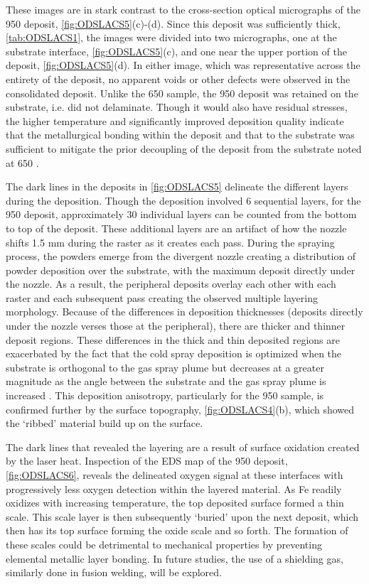 	These images are in stark contrast to the cross-section optical micrographs of the 950 \celsius{} deposit, \ref{fig:ODSLACS5}(c)-(d). Since this deposit was sufficiently thick, \ref{tab:ODSLACS1}, the images were divided into two micrographs, one at the substrate interface, \ref{fig:ODSLACS5}(c), and one near the upper portion of the deposit, \ref{fig:ODSLACS5}(d). In either image, which was representative across the entirety of the deposit, no apparent voids or other defects were observed in the consolidated deposit. Unlike the 650 \celsius{} sample, the 950 \celsius{} deposit was retained on the substrate, i.e. did not delaminate. Though it would also have residual stresses, the higher temperature and significantly improved deposition quality indicate that the metallurgical bonding within the deposit and that to the substrate was sufficient to mitigate the prior decoupling of the deposit from the substrate noted at 650 \celsius{}. 



	The dark lines in the deposits in \ref{fig:ODSLACS5} delineate the different layers during the deposition. Though the deposition involved 6 sequential layers, for the 950 \celsius{} deposit, approximately 30 individual layers can be counted from the bottom to top of the deposit. These additional layers are an artifact of how the nozzle shifts 1.5 mm during the raster as it creates each pass. During the spraying process, the powders emerge from the divergent nozzle creating a distribution of powder deposition over the substrate, with the maximum deposit directly under the nozzle. As a result, the peripheral deposits overlay each other with each raster and each subsequent pass creating the observed multiple layering morphology. Because of the differences in deposition thicknesses (deposits directly under the nozzle verses those at the peripheral), there are thicker and thinner deposit regions. These differences in the thick and thin deposited regions are exacerbated by the fact that the cold spray deposition is optimized when the substrate is orthogonal to the gas spray plume but decreases at a greater magnitude as the angle between the substrate and the gas spray plume is increased \cite{RN500}. This deposition anisotropy, particularly for the 950 \celsius{} sample, is confirmed further by the surface topography, \ref{fig:ODSLACS4}(b), which showed the ‘ribbed’ material build up on the surface. 



	 The dark lines that revealed the layering are a result of surface oxidation created by the laser heat. Inspection of the EDS map of the 950 \celsius{} deposit, \ref{fig:ODSLACS6}, reveals the delineated oxygen signal at these interfaces with progressively less oxygen detection within the layered material. As Fe readily oxidizes with increasing temperature, the top deposited surface formed a thin scale. This scale layer is then subsequently ‘buried’ upon the next deposit, which then has its top surface forming the oxide scale and so forth. The formation of these scales could be detrimental to mechanical properties by preventing elemental metallic layer bonding. In future studies, the use of a shielding gas, similarly done in fusion welding, will be explored. 




